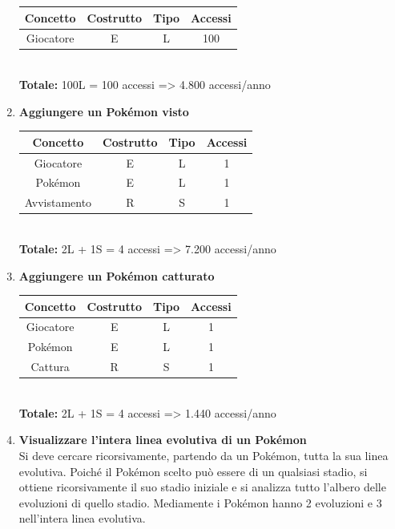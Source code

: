 \documentclass[a4paper,12pt]{report}
\begin{document}
\begin{enumerate}
  \begin{tabular}{|c|c|c|c|}
    \hline
  	\rowcolor{gray!30}Concetto & Costrutto & Tipo & Accessi \\
    \hline
    Giocatore & E & L & 100 \\
    \hline
  \end{tabular} \\

  \textbf{Totale:} 100L = 100 accessi => 4.800 accessi/anno \\
  
  \item \textbf{Aggiungere un Pokémon visto}
  
  \begin{tabular}{|c|c|c|c|}
  	\hline
  	\rowcolor{gray!30}Concetto & Costrutto & Tipo & Accessi \\
  	\hline
    Giocatore & E & L & 1 \\
    \hline
    Pokémon & E & L & 1 \\
    \hline
    Avvistamento & R & S & 1 \\
    \hline
  \end{tabular} \\
  
  \textbf{Totale:} 2L + 1S = 4 accessi => 7.200 accessi/anno
  
  \item \textbf{Aggiungere un Pokémon catturato}
  
  \begin{tabular}{|c|c|c|c|}
  	\hline
  	\rowcolor{gray!30}Concetto & Costrutto & Tipo & Accessi \\
  	\hline
    Giocatore & E & L & 1 \\
    \hline
    Pokémon & E & L & 1 \\
    \hline
    Cattura & R & S & 1 \\
    \hline
  \end{tabular} \\
  
  \textbf{Totale:} 2L + 1S = 4 accessi => 1.440 accessi/anno
  
  \item \textbf{Visualizzare l'intera linea evolutiva di un Pokémon} \\
  Si deve cercare ricorsivamente, partendo da un Pokémon, tutta la sua linea evolutiva. Poiché il Pokémon scelto può essere di un qualsiasi stadio, si ottiene ricorsivamente il suo stadio iniziale e si analizza tutto l'albero delle evoluzioni di quello stadio. Mediamente i Pokémon hanno 2 evoluzioni e 3 nell'intera linea evolutiva.
  

\end{enumerate}
\end{document}
